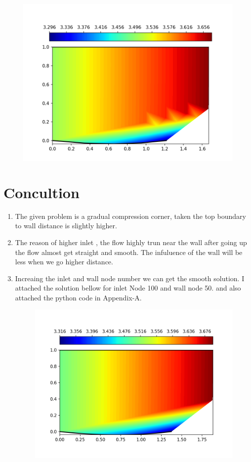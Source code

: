 \documentclass[conf]{new-aiaa}
\begin{document}
\begin{figure}[!h]
	\centering
	\includegraphics[scale=0.8]{results/Contour.png}
\end{figure}

\section{Concultion}
\begin{enumerate}
	\item The given problem is a gradual compression corner, taken the top boundary to wall distance is slightly higher. 
	\item The reason of higher inlet , the flow highly trun near the wall after going up the flow almost get straight and smooth. The infuluence of the wall will be less when we go higher distance.
	\item Increaing the inlet and wall node number we can get the smooth solution. I attached the solution bellow for inlet Node 100 and wall node 50. and also attached the python code in Appendix-A.
	\begin{figure}[h!]
		\centering
		\includegraphics[scale=0.8]{results/Contour2.png}
	\end{figure}
\end{enumerate}
\end{document}
